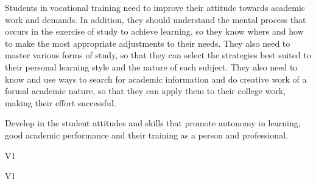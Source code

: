 \begin{syllabus}


\begin{justification}
Students in vocational training need to improve their attitude towards academic work and demands. In addition, they should understand the mental process that occurs in the exercise of study to achieve learning, so they know where and how to make the most appropriate adjustments to their needs. They also need to master various forms of study, so that they can select the strategies best suited to their personal learning style and the nature of each subject. They also need to know and use ways to search for academic information and do creative work of a formal academic nature, so that they can apply them to their college work, making their effort successful.
\end{justification}

\begin{goals}
\item Develop in the student attitudes and skills that promote autonomy in learning, good academic performance and their training as a person and professional.
\end{goals}

\begin{outcomes}{V1}
    \item {}
    \item {}
    \item {}
\end{outcomes}

\begin{specificoutcomes}{V1}
    \item {}
    \item {}
    \item {}
    \item {}
    \item {}
    \item {}
    \item {}
    \item {}
\end{specificoutcomes}


\end{syllabus}
